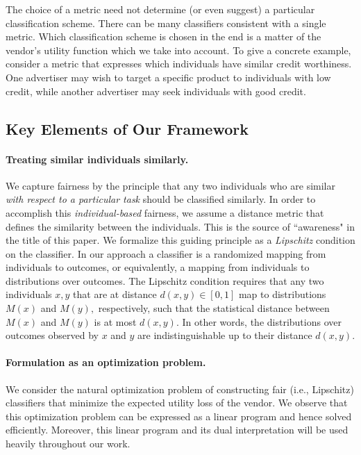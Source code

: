\documentclass[letterpaper,11pt]{article}
\theoremstyle{definition}
\newcommand{\vendor}{vendor}
\begin{document}
The choice of a metric need not determine (or even suggest) a
particular classification scheme. There can be many classifiers consistent
with a single metric. Which classification scheme is chosen in the end is
a matter of the \vendor 's utility function which we take into account. To give
a concrete example, consider a metric that expresses which individuals have
similar credit worthiness. One advertiser may wish to target a specific
product to individuals with low credit, while another advertiser may seek
individuals with good credit.


\subsection{Key Elements of Our Framework}

\paragraph{Treating similar individuals similarly.}
We capture fairness by the principle that any two individuals who are similar
{\em with respect to a particular task} should be classified similarly.  In
order to accomplish this \emph{individual-based} fairness, we assume a
distance metric that defines the similarity between the individuals. This is
the source of ``awareness" in the title of this paper. 
We formalize this guiding principle as a \emph{Lipschitz} condition on 
the classifier. 
In our approach a
classifier is a randomized mapping from individuals to outcomes, or
equivalently, a mapping from individuals to distributions over outcomes. 
The Lipschitz condition requires that any two individuals $x,y$ that
are at distance $d(x,y)\in[0,1]$ map to distributions $M(x)$ and $M(y),$
respectively, such that the statistical distance between $M(x)$ and $M(y)$ is
at most $d(x,y).$ In other words, the distributions over outcomes observed by $x$ and $y$ 
are indistinguishable up to their distance $d(x,y).$ 
%
\paragraph{Formulation as an optimization problem.}
%
We consider the natural optimization problem of constructing fair (i.e.,
Lipschitz) classifiers that minimize the expected utility loss of
the \vendor{}.
We observe that this optimization problem can be expressed as a linear program
and hence solved efficiently. Moreover, this linear program and its dual
interpretation will be used heavily throughout our work.
\end{document}
